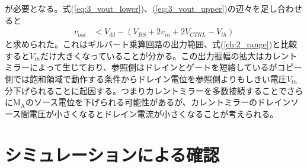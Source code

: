         が必要となる。式(\ref{eq:3_vout_lower})、(\ref{eq:3_vout_upper})の辺々を足し合わせると
        \begin{align}
            v_{out}&<V_{dd}-(V_{BS}+2v_{in}+2V_{CTRL}-V_{th})                  \label{eq:3_vout_range}
        \end{align}
        と求められた。これはギルバート乗算回路の出力範囲、式(\ref{ch:2_range})と比較すると$V_{th}$だけ大きくなっていることが分かる。この出力振幅の拡大はカレントミラーによって生じており、参照側はドレインとゲートを短絡しているがコピー側では飽和領域で動作する条件からドレイン電位を参照側よりもしきい電圧$V_{th}$分下げられることに起因する。つまりカレントミラーを多数接続することでさらに$\mathrm{M_{A}}$のソース電位を下げられる可能性があるが、カレントミラーのドレインソース間電圧が小さくなるとドレイン電流が小さくなることが考えられる。


    \section{シミュレーションによる確認}
        
